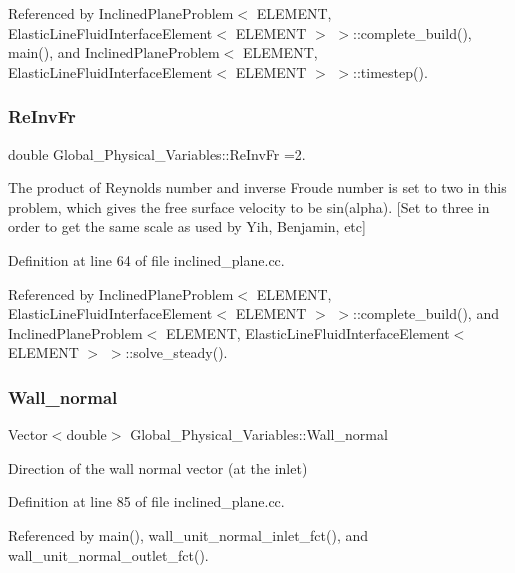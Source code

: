 Referenced by Inclined\+Plane\+Problem$<$ E\+L\+E\+M\+E\+N\+T, Elastic\+Line\+Fluid\+Interface\+Element$<$ E\+L\+E\+M\+E\+N\+T $>$ $>$\+::complete\+\_\+build(), main(), and Inclined\+Plane\+Problem$<$ E\+L\+E\+M\+E\+N\+T, Elastic\+Line\+Fluid\+Interface\+Element$<$ E\+L\+E\+M\+E\+N\+T $>$ $>$\+::timestep().

\mbox{\label{namespaceGlobal__Physical__Variables_aa6286f02b476912dd7550eced538331a}} 
\subsubsection{\texorpdfstring{Re\+Inv\+Fr}{ReInvFr}}
{\footnotesize\ttfamily double Global\+\_\+\+Physical\+\_\+\+Variables\+::\+Re\+Inv\+Fr =2.}

The product of Reynolds number and inverse Froude number is set to two in this problem, which gives the free surface velocity to be sin(alpha). \mbox{[}Set to three in order to get the same scale as used by Yih, Benjamin, etc\mbox{]} 

Definition at line 64 of file inclined\+\_\+plane.\+cc.



Referenced by Inclined\+Plane\+Problem$<$ E\+L\+E\+M\+E\+N\+T, Elastic\+Line\+Fluid\+Interface\+Element$<$ E\+L\+E\+M\+E\+N\+T $>$ $>$\+::complete\+\_\+build(), and Inclined\+Plane\+Problem$<$ E\+L\+E\+M\+E\+N\+T, Elastic\+Line\+Fluid\+Interface\+Element$<$ E\+L\+E\+M\+E\+N\+T $>$ $>$\+::solve\+\_\+steady().

\mbox{\label{namespaceGlobal__Physical__Variables_a5feb3df21fc4a0adefadecb8a8ed98d7}} 
\subsubsection{\texorpdfstring{Wall\+\_\+normal}{Wall\_normal}}
{\footnotesize\ttfamily Vector$<$double$>$ Global\+\_\+\+Physical\+\_\+\+Variables\+::\+Wall\+\_\+normal}



Direction of the wall normal vector (at the inlet) 



Definition at line 85 of file inclined\+\_\+plane.\+cc.



Referenced by main(), wall\+\_\+unit\+\_\+normal\+\_\+inlet\+\_\+fct(), and wall\+\_\+unit\+\_\+normal\+\_\+outlet\+\_\+fct().

